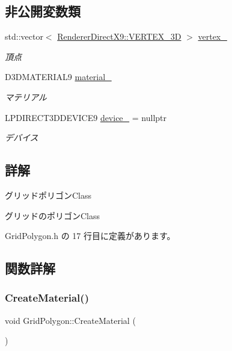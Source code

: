 \subsection*{非公開変数類}
\begin{DoxyCompactItemize}
\item 
std\+::vector$<$ \mbox{\hyperlink{class_renderer_direct_x9_1_1_v_e_r_t_e_x__3_d}{Renderer\+Direct\+X9\+::\+V\+E\+R\+T\+E\+X\+\_\+3D}} $>$ \mbox{\hyperlink{class_grid_polygon_a71923f80b111b2868553f9f3600fa192}{vertex\+\_\+}}
\begin{DoxyCompactList}\small\item\em 頂点 \end{DoxyCompactList}\item 
D3\+D\+M\+A\+T\+E\+R\+I\+A\+L9 \mbox{\hyperlink{class_grid_polygon_a5aabcb6eed028eb7b093ce8f4e6936a8}{material\+\_\+}}
\begin{DoxyCompactList}\small\item\em マテリアル \end{DoxyCompactList}\item 
L\+P\+D\+I\+R\+E\+C\+T3\+D\+D\+E\+V\+I\+C\+E9 \mbox{\hyperlink{class_grid_polygon_a23d509ae7ad001e003897527380a8ca8}{device\+\_\+}} = nullptr
\begin{DoxyCompactList}\small\item\em デバイス \end{DoxyCompactList}\end{DoxyCompactItemize}


\subsection{詳解}
グリッドポリゴン\+Class 

グリッドのポリゴン\+Class 

 Grid\+Polygon.\+h の 17 行目に定義があります。



\subsection{関数詳解}
\mbox{\label{class_grid_polygon_a6e9fc436896409cc4bfbf3a44d338d9b}} 
\subsubsection{\texorpdfstring{Create\+Material()}{CreateMaterial()}}
{\footnotesize\ttfamily void Grid\+Polygon\+::\+Create\+Material (\begin{DoxyParamCaption}{ }\end{DoxyParamCaption})\hspace{0.3cm}{\ttfamily [private]}}




